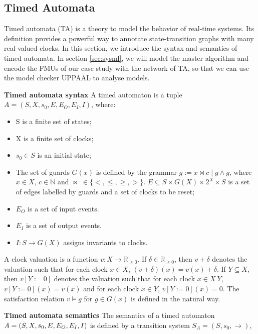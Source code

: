 \subsection{Timed Automata}
Timed automata (TA) \cite{BehrmannDLHPYH06} is a theory to model the behavior of real-time systems. Its definition provides a powerful way to annotate state-transition graphs with many real-valued clocks. In this section, we introduce the syntax and semantics of timed automata. In section \ref{sec:sysml}, we will model the master algorithm and encode the FMUs of our case study with the network of TA, so that we can use the model checker UPPAAL to analyse models.
\begin{definition}
\textbf{Timed automata syntax}
A timed automaton is a tuple $\textit{A}=(S,X,s_{0},E,E_{O},E_{I},I)$, where:
\end{definition}
\begin{itemize}
\item
S is a finite set of states;
\item
X is a finite set of clocks;
\item
$s_{0}\in  S$ is an initial state;
\item
The set of guards $G(x)$ is defined by the grammar $g := x \bowtie c \mid g \land g$, where $x \in X$, $c \in \mathbb{N}$ and $\bowtie~\in \{<,\leqslant,\geqslant,>\}$. $E\subseteq S \times G(X) \times 2^X \times S$ is a set of edges labelled by guards and a set of clocks to be reset;
\item
$E_{O}$ is a set of input events.
\item
$E_{I}$ is a set of output events.
\item
$I : S \rightarrow G(X)$ assigns invariants to clocks.
\end{itemize}
A clock valuation is a function $v : X \rightarrow \mathbb{R}_{\geqslant{0}}$. If $\delta \in \mathbb{R}_{\geqslant{0}}$, then $v + \delta$ denotes the valuation such that for each clock $x \in X$, $(v + \delta)(x) = v(x) + \delta$. If $Y \subseteq X$, then $v[Y := 0]$ denotes the valuation such that for each clock $x \in X~Y$, $v[Y := 0 ](x) = v(x)$ and for each clock $x \in Y$, $v[Y := 0](x) = 0$. The satisfaction relation $v \models g$ for $g \in G(x)$ is defined in the natural way.
\begin{definition}
\textbf{Timed automata semantics} 
The semantics of a timed automaton $\textit{A} = (S,X,s_{0},E, \\E_{O},E_{I},I)$ is defined by a transition system $S_{\textit{A}} = (S,s_{0},\rightarrow)$, \end{definition}
